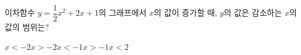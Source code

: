 이차함수 $y=\dfrac{1}{2}x^2+2x+1$의 그래프에서 $x$의 값이 증가할 때, $y$의 값은 감소하는 $x$의 값의 범위는?
\begin{choices32}{$x<-2$}{$x>-2$}{$x<-1$}{$x>-1$}{$x<2$}\end{choices32}
